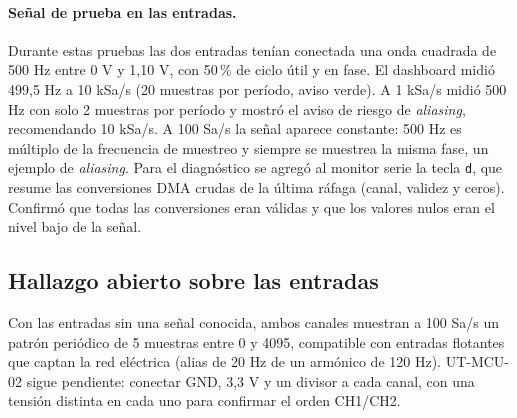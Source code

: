 \documentclass[12pt,a4paper]{article}
\begin{document}
\paragraph{Señal de prueba en las entradas.} Durante estas pruebas las dos entradas tenían conectada una onda cuadrada de 500 Hz entre 0 V y 1{,}10 V, con 50\,\% de ciclo útil y en fase. El dashboard midió 499{,}5 Hz a 10 kSa/s (20 muestras por período, aviso verde). A 1 kSa/s midió 500 Hz con solo 2 muestras por período y mostró el aviso de riesgo de \emph{aliasing}, recomendando 10 kSa/s. A 100 Sa/s la señal aparece constante: 500 Hz es múltiplo de la frecuencia de muestreo y siempre se muestrea la misma fase, un ejemplo de \emph{aliasing}. Para el diagnóstico se agregó al monitor serie la tecla \texttt{d}, que resume las conversiones DMA crudas de la última ráfaga (canal, validez y ceros). Confirmó que todas las conversiones eran válidas y que los valores nulos eran el nivel bajo de la señal.

\subsection{Hallazgo abierto sobre las entradas}

Con las entradas sin una señal conocida, ambos canales muestran a 100 Sa/s un patrón periódico de 5 muestras entre 0 y 4095, compatible con entradas flotantes que captan la red eléctrica (alias de 20 Hz de un armónico de 120 Hz). UT-MCU-02 sigue pendiente: conectar GND, 3{,}3 V y un divisor a cada canal, con una tensión distinta en cada uno para confirmar el orden CH1/CH2.
\end{document}

